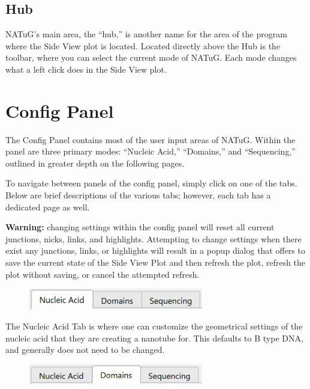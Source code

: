 \documentclass[titlepage]{article}
\begin{document}
	\subsection{Hub}
	NATuG’s main area, the “hub,” is another name for the area of the program where the Side View plot is located. Located directly above the Hub is the toolbar, where you can select the current mode of NATuG. Each mode changes what a left click does in the Side View plot.
	
	\newpage
	\section{Config Panel} \label{section:config-panel}
	The Config Panel contains most of the user input areas of NATuG. Within the panel are three primary modes: “Nucleic Acid,” “Domains,” and “Sequencing,” outlined in greater depth on the following pages. 
	
	To navigate between panels of the config panel, simply click on one of the tabs. Below are brief descriptions of the various tabs; however, each tab has a dedicated page as well.
	
	\textbf{Warning:} changing settings within the config panel will reset all current junctions, nicks, links, and highlights. Attempting to change settings when there exist any junctions, links, or highlights will result in a popup dialog that offers to save the current state of the Side View Plot and then refresh the plot, refresh the plot without saving, or cancel the attempted refresh.
	
	\begin{figure}[h]
		\centering
		\includegraphics[width=3in]{"nucleic-acid-tab-activated.png"}
		\label{fig:nucleic-acid-tab-activated}
	\end{figure}

	The Nucleic Acid Tab is where one can customize the geometrical settings of the nucleic acid that they are creating a nanotube for. This defaults to B type DNA, and generally does not need to be changed. 

	\begin{figure}[h]
		\centering
		\includegraphics[width=3in]{"domains-tab-activated.png"}
		\label{fig:domains-tab-activated}
	\end{figure}
\end{document}
